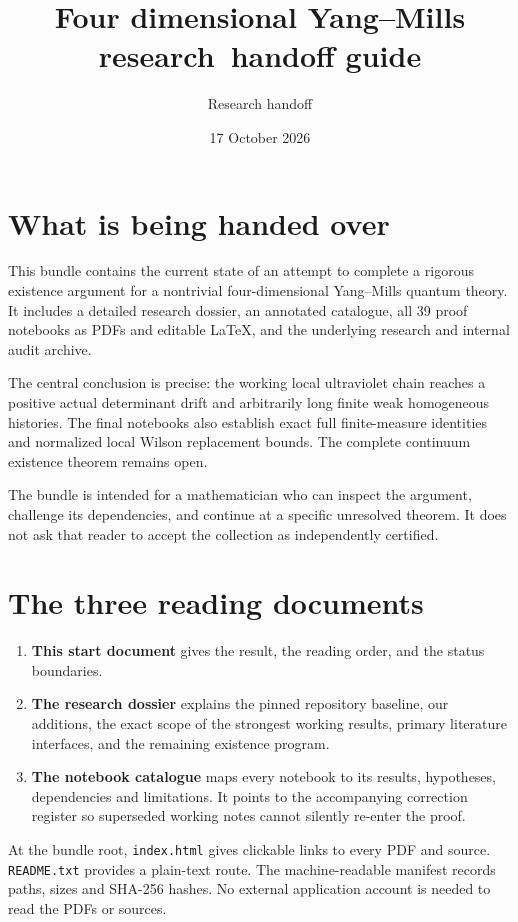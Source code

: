 \documentclass[11pt]{article}
\author{Research handoff}
\date{17 October 2026}
\title{Four dimensional Yang--Mills research\ handoff guide}
\theoremstyle{remark}
\begin{document}
\maketitle
\section*{What is being handed over}

This bundle contains the current state of an attempt to complete
a rigorous existence argument for a nontrivial four-dimensional
Yang--Mills quantum theory. It includes a detailed research
dossier, an annotated catalogue, all 39 proof notebooks as
PDFs and editable LaTeX, and the underlying research and
internal audit archive.

The central conclusion is precise: the working local ultraviolet
chain reaches a positive actual determinant drift and arbitrarily
long finite weak homogeneous histories. The final notebooks also
establish exact full finite-measure identities and normalized
local Wilson replacement bounds. The complete continuum
existence theorem remains open.

The bundle is intended for a mathematician who can inspect
the argument, challenge its dependencies, and continue at a
specific unresolved theorem. It does not ask that reader
to accept the collection as independently certified.

\section*{The three reading documents}

\begin{enumerate}
\item \textbf{This start document} gives the result, the
reading order, and the status boundaries.
\item \textbf{The research dossier} explains the pinned
repository baseline, our additions, the exact scope of
the strongest working results, primary literature
interfaces, and the remaining existence program.
\item \textbf{The notebook catalogue} maps every notebook
to its results, hypotheses, dependencies and limitations.
It points to the accompanying correction register so superseded working
notes cannot silently re-enter the proof.
\end{enumerate}

At the bundle root, \texttt{index.html} gives clickable
links to every PDF and source. \texttt{README.txt}
provides a plain-text route. The machine-readable
manifest records paths, sizes and SHA-256 hashes.
No external application account is needed to read
the PDFs or sources.
\end{document}
